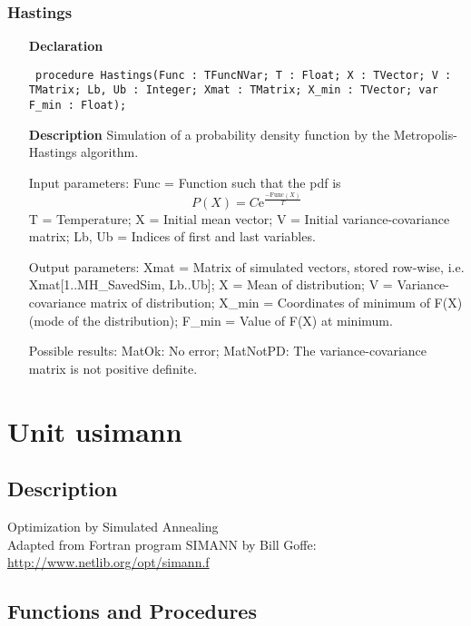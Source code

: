 \documentclass[12pt,a4paper,oneside]{report}
\newcommand{\euler}{\mathrm{e}}
\newcommand{\declarationitem}[1]{\textbf{#1}}
\newcommand{\descriptiontitle}[1]{\textbf{#1}}
\newcommand{\code}[1]{\texttt{#1}}
\begin{document}
\subsubsection{Hastings}
\label{umcmc-Hastings}
\begin{itemize}\item[\declarationitem{Declaration}\hfill]
	\begin{flushleft}
		\code{
			procedure Hastings(Func : TFuncNVar; T : Float; X : TVector; V : TMatrix; Lb, Ub : Integer; Xmat : TMatrix; X{\_}min : TVector; var F{\_}min : Float);}
		
	\end{flushleft}
	
	\par
	\item[\descriptiontitle{Description}]
	Simulation of a probability density function by the Metropolis{-}Hastings algorithm.
	
	Input parameters: Func = Function such that the pdf is 
	$$
	P(X) = C \euler^\frac{-\textrm{Func}(X)}{T}
	$$ 
	T = Temperature; X = Initial mean vector; V = Initial variance{-}covariance matrix; Lb, Ub = Indices of first and last variables.
	
	Output parameters: Xmat = Matrix of simulated vectors, stored row{-}wise, i.e. Xmat[1..MH{\_}SavedSim, Lb..Ub]; X = Mean of distribution; V = Variance{-}covariance matrix of distribution; X{\_}min = Coordinates of minimum of F(X) (mode of the distribution); F{\_}min = Value of F(X) at minimum.
	
	Possible results: MatOk: No error; MatNotPD: The variance{-}covariance matrix is not positive definite.
\end{itemize}
\section{Unit usimann}
\label{usimann}
\subsection{Description}
Optimization by Simulated Annealing\\ 
Adapted from Fortran program SIMANN by Bill Goffe:\\ 
\href{http://www.netlib.org/opt/simann.f}{http://www.netlib.org/opt/simann.f} 
\subsection{Functions and Procedures}
\end{document}
